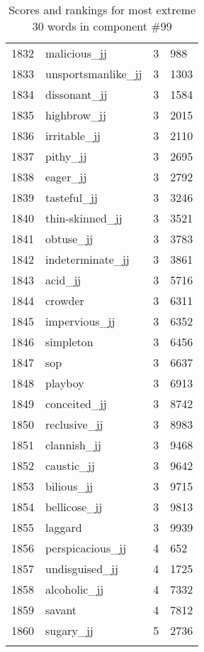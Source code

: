 \begin{longtable}[!htbp]{| rlr@{.}l |}
    1832 & malicious\_jj & 3 & 988 \\
    1833 & unsportsmanlike\_jj & 3 & 1303 \\
    1834 & dissonant\_jj & 3 & 1584 \\
    1835 & highbrow\_jj & 3 & 2015 \\
    1836 & irritable\_jj & 3 & 2110 \\
    1837 & pithy\_jj & 3 & 2695 \\
    1838 & eager\_jj & 3 & 2792 \\
    1839 & tasteful\_jj & 3 & 3246 \\
    1840 & thin-skinned\_jj & 3 & 3521 \\
    1841 & obtuse\_jj & 3 & 3783 \\
    1842 & indeterminate\_jj & 3 & 3861 \\
    1843 & acid\_jj & 3 & 5716 \\
    1844 & crowder & 3 & 6311 \\
    1845 & impervious\_jj & 3 & 6352 \\
    1846 & simpleton & 3 & 6456 \\
    1847 & sop & 3 & 6637 \\
    1848 & playboy & 3 & 6913 \\
    1849 & conceited\_jj & 3 & 8742 \\
    1850 & reclusive\_jj & 3 & 8983 \\
    1851 & clannish\_jj & 3 & 9468 \\
    1852 & caustic\_jj & 3 & 9642 \\
    1853 & bilious\_jj & 3 & 9715 \\
    1854 & bellicose\_jj & 3 & 9813 \\
    1855 & laggard & 3 & 9939 \\
    1856 & perspicacious\_jj & 4 & 652 \\
    1857 & undisguised\_jj & 4 & 1725 \\
    1858 & alcoholic\_jj & 4 & 7332 \\
    1859 & savant & 4 & 7812 \\
    1860 & sugary\_jj & 5 & 2736 \\
    \hline
    \caption{Scores and rankings for most extreme 30 words in component \#99} \\
\end{longtable}
